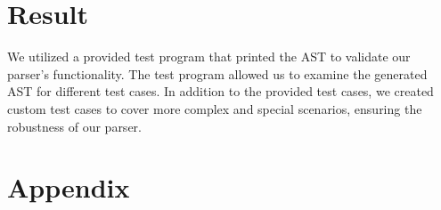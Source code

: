 \documentclass[12pt]{article}
\begin{document}

\section{Result}
We utilized a provided test program that printed the AST to validate our parser's functionality.
The test program allowed us to examine the generated AST for different test cases.
In addition to the provided test cases, we created custom test cases to cover more complex and special scenarios, ensuring the robustness of our parser.




\appendix
{}
\section{Appendix}
\end{document}
